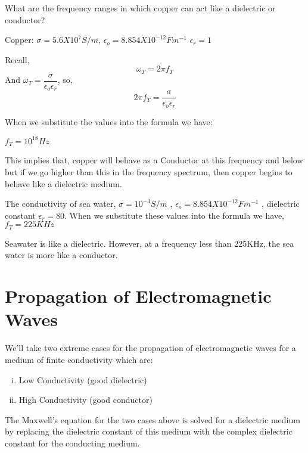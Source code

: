 \begin{exmp}
What are the frequency ranges in which copper can act like a dielectric or conductor?

Copper: $\sigma = 5.6 X 10^{7}S/m$, 
$\epsilon_{o} = 8.854 X 10^{-12}Fm^{-1}$ $\epsilon_{r} = 1$

Recall,
\begin{equation}
\omega_{T} = 2\pi f_{T}
\end{equation}
And $ \omega_{T} = \dfrac{\sigma}{\epsilon_{o}\epsilon_{r}}$, so,
\begin{equation}
2\pi f_{T} = \dfrac{\sigma}{\epsilon_{o}\epsilon_{r}}
\end{equation}

When we substitute the values into the formula we have:

$f_{T} = 10^{18}Hz$

This implies that, copper will behave as a Conductor at this frequency and below but if we go higher than this in the frequency spectrum, then copper begins to behave like a dielectric medium.
\end{exmp}

\begin{exmp}
The conductivity of sea water, $\sigma = 10^{-3}S/m$ , $\epsilon_{o} = 8.854 X 10^{-12}Fm^{-1}$ , dielectric constant $\epsilon_{r} = 80$.
When we substitute these values into the formula we have, $f_T=225KHz$

Seawater is like a dielectric. However, at a frequency less than 225KHz, the sea water is more like a conductor.
\end{exmp}

\section{Propagation of Electromagnetic Waves}
We'll take two extreme cases for the propagation of electromagnetic waves for a medium of finite conductivity which are:
\begin{enumerate}[(i)]
\item Low Conductivity (good dielectric)
\item High Conductivity (good conductor)
\end{enumerate}
The Maxwell's equation for the two cases above is solved for a dielectric medium by replacing the dielectric constant of this medium with the complex dielectric constant for the conducting medium. 

